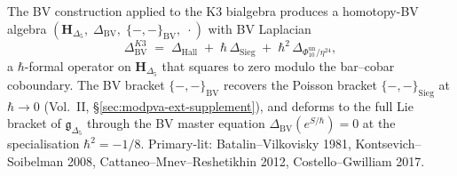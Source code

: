 \begin{remark}
\label{rem:bvconstr-ext-1}
The BV construction applied to the K3 bialgebra produces a
homotopy-BV algebra
$(\mathbf H_{\Delta_5},\; \Delta_{\mathrm{BV}},\; \{-,-\}_{\mathrm{BV}},\; \cdot)$
with BV Laplacian
\[
\Delta_{\mathrm{BV}}^{K3} \;=\; \Delta_{\mathrm{Hall}} \;+\; \hbar\, \Delta_{\mathrm{Sieg}} \;+\; \hbar^2\, \Delta_{\Phi_{10}^{\mathrm{un}}/\eta^{24}},
\]
a $\hbar$-formal operator on $\mathbf H_{\Delta_5}$ that squares to zero
modulo the bar--cobar coboundary. The BV bracket $\{-,-\}_{\mathrm{BV}}$
recovers the Poisson bracket $\{-,-\}_{\mathrm{Sieg}}$ at
$\hbar\to 0$ (Vol.~II, \S\ref{sec:modpva-ext-supplement}), and deforms
to the full Lie bracket of $\mathfrak g_{\Delta_5}$ through the
BV master equation $\Delta_{\mathrm{BV}}(e^{S/\hbar}) = 0$ at the
specialisation $\hbar^2 = -1/8$. Primary-lit: Batalin--Vilkovisky 1981,
Kontsevich--Soibelman 2008, Cattaneo--Mnev--Reshetikhin 2012,
Costello--Gwilliam 2017.
\end{remark}
